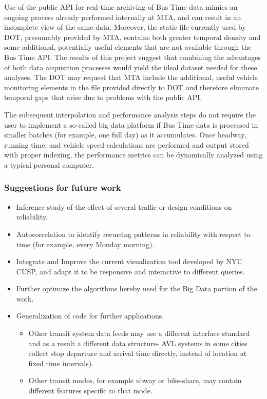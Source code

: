 \documentclass[12pt]{report}
\begin{document}
Use of the public API for real-time archiving of Bus Time data mimics an ongoing process already performed internally at MTA, and can result in an incomplete view of the same data.  Moreover, the static file currently used by DOT, presumably provided by MTA, contains both greater temporal density and some additional, potentially useful elements that are not available through the Bus Time API.  The results of this project suggest that combining the advantages of both data acquisition processes would yield the ideal dataset needed for these analyses.  The DOT may request that MTA include the additional, useful vehicle monitoring elements in the file provided directly to DOT and therefore eliminate temporal gaps that arise due to problems with the public API.


The subsequent interpolation and performance analysis steps do not require the user to implement a so-called big data platform if Bus Time data is processed in smaller batches (for example, one full day) as it accumulates.  Once headway, running time, and vehicle speed calculations are performed and output stored with proper indexing, the performance metrics can be dynamically analyzed using a typical personal computer.


\subsubsection*{Suggestions for future work}

\begin{itemize}
\item Inference study of the effect of several traffic or design conditions on reliability.
\item  Autocorrelation to identify recurring patterns in reliability with respect to time (for example, every Monday morning).
\item Integrate and Improve the current visualization tool developed by NYU CUSP, and adapt it to be responsive and interactive to different queries.
\item Further optimize the algorithms hereby used for the Big Data portion of the work.
\item Generalization of code for further applications.
\begin{itemize}
\item Other transit system data feeds may use a different interface standard and as a result a different data structure-   AVL systems in some cities collect stop departure and arrival time directly, instead of location at fixed time intervals).
\item Other transit modes, for example ubway or bike-share,  may contain different features specific to that mode.
\end{itemize}
\end{itemize}
\end{document}
